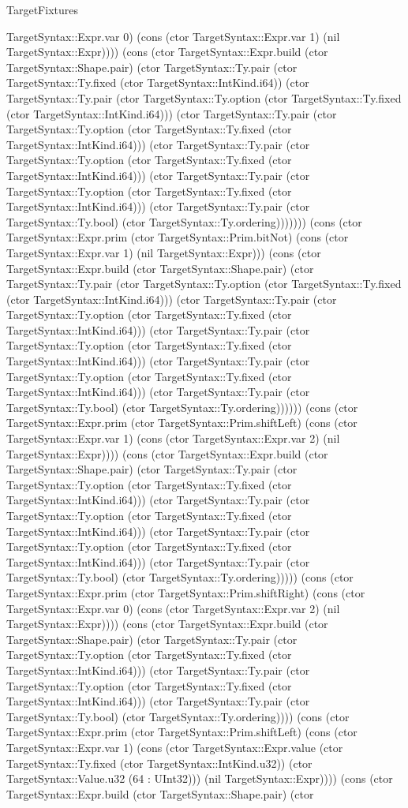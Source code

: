 \begin{lexlean}{TargetFixtures}
\begin{semanticmodule}
{TargetSyntax::Expr.var 0) (cons (ctor TargetSyntax::Expr.var 1) (nil TargetSyntax::Expr)))) (cons (ctor TargetSyntax::Expr.build (ctor TargetSyntax::Shape.pair) (ctor TargetSyntax::Ty.pair (ctor TargetSyntax::Ty.fixed (ctor TargetSyntax::IntKind.i64)) (ctor TargetSyntax::Ty.pair (ctor TargetSyntax::Ty.option (ctor TargetSyntax::Ty.fixed (ctor TargetSyntax::IntKind.i64))) (ctor TargetSyntax::Ty.pair (ctor TargetSyntax::Ty.option (ctor TargetSyntax::Ty.fixed (ctor TargetSyntax::IntKind.i64))) (ctor TargetSyntax::Ty.pair (ctor TargetSyntax::Ty.option (ctor TargetSyntax::Ty.fixed (ctor TargetSyntax::IntKind.i64))) (ctor TargetSyntax::Ty.pair (ctor TargetSyntax::Ty.option (ctor TargetSyntax::Ty.fixed (ctor TargetSyntax::IntKind.i64))) (ctor TargetSyntax::Ty.pair (ctor TargetSyntax::Ty.bool) (ctor TargetSyntax::Ty.ordering))))))) (cons (ctor TargetSyntax::Expr.prim (ctor TargetSyntax::Prim.bitNot) (cons (ctor TargetSyntax::Expr.var 1) (nil TargetSyntax::Expr))) (cons (ctor TargetSyntax::Expr.build (ctor TargetSyntax::Shape.pair) (ctor TargetSyntax::Ty.pair (ctor TargetSyntax::Ty.option (ctor TargetSyntax::Ty.fixed (ctor TargetSyntax::IntKind.i64))) (ctor TargetSyntax::Ty.pair (ctor TargetSyntax::Ty.option (ctor TargetSyntax::Ty.fixed (ctor TargetSyntax::IntKind.i64))) (ctor TargetSyntax::Ty.pair (ctor TargetSyntax::Ty.option (ctor TargetSyntax::Ty.fixed (ctor TargetSyntax::IntKind.i64))) (ctor TargetSyntax::Ty.pair (ctor TargetSyntax::Ty.option (ctor TargetSyntax::Ty.fixed (ctor TargetSyntax::IntKind.i64))) (ctor TargetSyntax::Ty.pair (ctor TargetSyntax::Ty.bool) (ctor TargetSyntax::Ty.ordering)))))) (cons (ctor TargetSyntax::Expr.prim (ctor TargetSyntax::Prim.shiftLeft) (cons (ctor TargetSyntax::Expr.var 1) (cons (ctor TargetSyntax::Expr.var 2) (nil TargetSyntax::Expr)))) (cons (ctor TargetSyntax::Expr.build (ctor TargetSyntax::Shape.pair) (ctor TargetSyntax::Ty.pair (ctor TargetSyntax::Ty.option (ctor TargetSyntax::Ty.fixed (ctor TargetSyntax::IntKind.i64))) (ctor TargetSyntax::Ty.pair (ctor TargetSyntax::Ty.option (ctor TargetSyntax::Ty.fixed (ctor TargetSyntax::IntKind.i64))) (ctor TargetSyntax::Ty.pair (ctor TargetSyntax::Ty.option (ctor TargetSyntax::Ty.fixed (ctor TargetSyntax::IntKind.i64))) (ctor TargetSyntax::Ty.pair (ctor TargetSyntax::Ty.bool) (ctor TargetSyntax::Ty.ordering))))) (cons (ctor TargetSyntax::Expr.prim (ctor TargetSyntax::Prim.shiftRight) (cons (ctor TargetSyntax::Expr.var 0) (cons (ctor TargetSyntax::Expr.var 2) (nil TargetSyntax::Expr)))) (cons (ctor TargetSyntax::Expr.build (ctor TargetSyntax::Shape.pair) (ctor TargetSyntax::Ty.pair (ctor TargetSyntax::Ty.option (ctor TargetSyntax::Ty.fixed (ctor TargetSyntax::IntKind.i64))) (ctor TargetSyntax::Ty.pair (ctor TargetSyntax::Ty.option (ctor TargetSyntax::Ty.fixed (ctor TargetSyntax::IntKind.i64))) (ctor TargetSyntax::Ty.pair (ctor TargetSyntax::Ty.bool) (ctor TargetSyntax::Ty.ordering)))) (cons (ctor TargetSyntax::Expr.prim (ctor TargetSyntax::Prim.shiftLeft) (cons (ctor TargetSyntax::Expr.var 1) (cons (ctor TargetSyntax::Expr.value (ctor TargetSyntax::Ty.fixed (ctor TargetSyntax::IntKind.u32)) (ctor TargetSyntax::Value.u32 (64 : UInt32))) (nil TargetSyntax::Expr)))) (cons (ctor TargetSyntax::Expr.build (ctor TargetSyntax::Shape.pair) (ctor }
\end{semanticmodule}
\end{lexlean}
